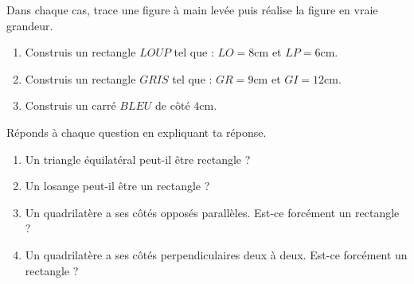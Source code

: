 \documentclass[a4paper,10pt]{report}
\begin{document}
\begin{ex}
Dans chaque cas, trace une figure à main levée puis réalise la figure en vraie grandeur.

\begin{enumerate}
\item Construis un rectangle $LOUP$ tel que : $LO=8$cm et $LP=6$cm.
\item Construis un rectangle $GRIS$ tel que : $GR=9$cm et $GI=12$cm.
\item Construis un carré $BLEU$ de côté $4$cm.
\end{enumerate}
\end{ex}

\begin{ex}
Réponds à chaque question en expliquant ta réponse.

\begin{enumerate}
\item Un triangle équilatéral peut-il être rectangle ?
\item Un losange peut-il être un rectangle ?
\item Un quadrilatère a ses côtés opposés parallèles. Est-ce forcément un rectangle ?
\item Un quadrilatère a ses côtés perpendiculaires deux à deux. Est-ce forcément un rectangle ?
\end{enumerate}
\end{ex}
\end{document}
